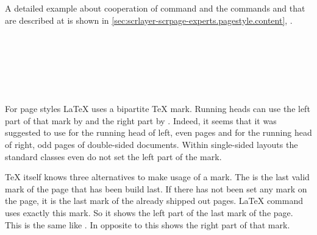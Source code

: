 \begin{Example}
\begin{lstcode}
  \blinddocument
  
\end{lstcode}
\end{Example}
\else %
  \par %
  A detailed example about cooperation of command 
  and the commands  and 
  that are described at  is shown in
  \autoref{sec:scrlayer-scrpage-experts.pagestyle.content},
  .%
\fi %
%
%

\ifnum{}\else
\begin{Declaration}
  \\
  \\
  \\
  \\
  \\
\end{Declaration}
%
%
%
%
%
%
For page styles \LaTeX{} uses a bipartite
\TeX{} mark. Running heads can use the left part of that mark by
 and the right
part by
. Indeed, it
seems that it was suggested to use  for the running head of
left, even pages and  for the running head of right, odd
pages of double-sided documents. Within single-sided layouts the standard
classes even do not set the left part of the mark.

\TeX{} itself knows three alternatives to make usage of a mark. The
 is the last valid mark of the page that has been build
last. If there has not been set any mark on the page, it is the last mark of the
already shipped out pages. \LaTeX{} command  uses exactly this
mark. So it shows the left part of the last mark of the page. This is the same
like . In opposite to this  shows the
right part of that mark.

